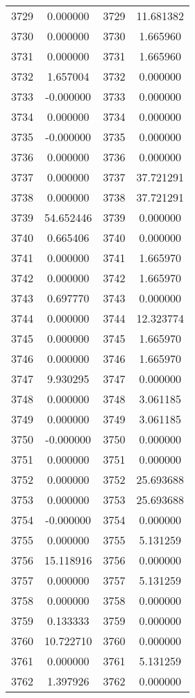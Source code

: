 \documentclass[12pt]{article}
\begin{document}
\begin{longtable}{@{}cccc@{}}
3729 & 0.000000 & 3729 & 11.681382 \\
3730 & 0.000000 & 3730 & 1.665960 \\
3731 & 0.000000 & 3731 & 1.665960 \\
3732 & 1.657004 & 3732 & 0.000000 \\
3733 & -0.000000 & 3733 & 0.000000 \\
3734 & 0.000000 & 3734 & 0.000000 \\
3735 & -0.000000 & 3735 & 0.000000 \\
3736 & 0.000000 & 3736 & 0.000000 \\
3737 & 0.000000 & 3737 & 37.721291 \\
3738 & 0.000000 & 3738 & 37.721291 \\
3739 & 54.652446 & 3739 & 0.000000 \\
3740 & 0.665406 & 3740 & 0.000000 \\
3741 & 0.000000 & 3741 & 1.665970 \\
3742 & 0.000000 & 3742 & 1.665970 \\
3743 & 0.697770 & 3743 & 0.000000 \\
3744 & 0.000000 & 3744 & 12.323774 \\
3745 & 0.000000 & 3745 & 1.665970 \\
3746 & 0.000000 & 3746 & 1.665970 \\
3747 & 9.930295 & 3747 & 0.000000 \\
3748 & 0.000000 & 3748 & 3.061185 \\
3749 & 0.000000 & 3749 & 3.061185 \\
3750 & -0.000000 & 3750 & 0.000000 \\
3751 & 0.000000 & 3751 & 0.000000 \\
3752 & 0.000000 & 3752 & 25.693688 \\
3753 & 0.000000 & 3753 & 25.693688 \\
3754 & -0.000000 & 3754 & 0.000000 \\
3755 & 0.000000 & 3755 & 5.131259 \\
3756 & 15.118916 & 3756 & 0.000000 \\
3757 & 0.000000 & 3757 & 5.131259 \\
3758 & 0.000000 & 3758 & 0.000000 \\
3759 & 0.133333 & 3759 & 0.000000 \\
3760 & 10.722710 & 3760 & 0.000000 \\
3761 & 0.000000 & 3761 & 5.131259 \\
3762 & 1.397926 & 3762 & 0.000000 \\

\end{longtable}
\end{document}
